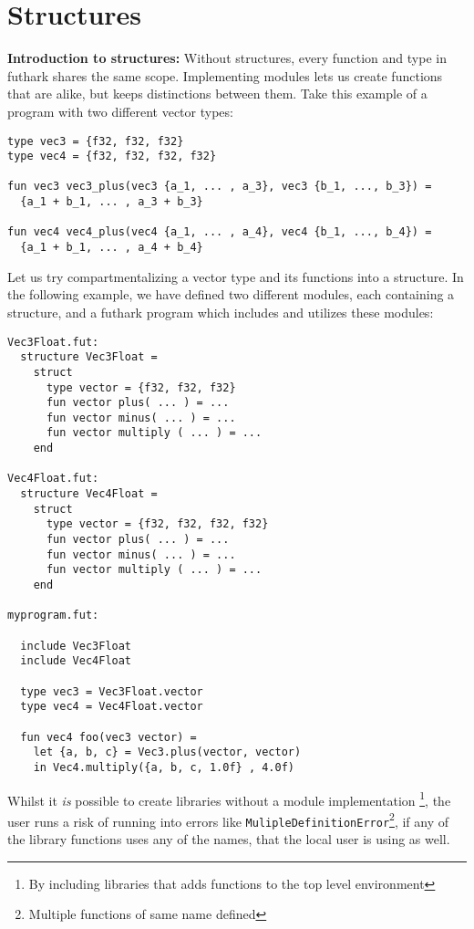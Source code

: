 \section{Structures}
\label{sec:structures}
\textbf{Introduction to structures:}
\label{subsec:structuresaregood}
Without structures, every function and type in futhark shares the same scope.
Implementing modules lets us create functions that are alike, but keeps
distinctions between them.
Take this example of a program with two different vector types:

\begin{verbatim}
type vec3 = {f32, f32, f32}
type vec4 = {f32, f32, f32, f32}

fun vec3 vec3_plus(vec3 {a_1, ... , a_3}, vec3 {b_1, ..., b_3}) =
  {a_1 + b_1, ... , a_3 + b_3}

fun vec4 vec4_plus(vec4 {a_1, ... , a_4}, vec4 {b_1, ..., b_4}) =
  {a_1 + b_1, ... , a_4 + b_4}
\end{verbatim}

Let us try compartmentalizing a vector type and its functions into a structure.
In the following example, we have defined two different modules, each
containing a structure,
and a futhark program which includes and utilizes these modules:
\begin{verbatim}
Vec3Float.fut:
  structure Vec3Float = 
    struct
      type vector = {f32, f32, f32}
      fun vector plus( ... ) = ...
      fun vector minus( ... ) = ...
      fun vector multiply ( ... ) = ...
    end

Vec4Float.fut:
  structure Vec4Float = 
    struct
      type vector = {f32, f32, f32, f32}
      fun vector plus( ... ) = ...
      fun vector minus( ... ) = ...
      fun vector multiply ( ... ) = ...
    end
  
myprogram.fut:

  include Vec3Float
  include Vec4Float

  type vec3 = Vec3Float.vector
  type vec4 = Vec4Float.vector
  
  fun vec4 foo(vec3 vector) = 
    let {a, b, c} = Vec3.plus(vector, vector)
    in Vec4.multiply({a, b, c, 1.0f} , 4.0f)
\end{verbatim}

Whilst it \textit{is} possible to create libraries without a module
implementation \footnote{By including libraries that adds functions to the top
  level environment}, the user runs a risk of running into errors like
\texttt{MulipleDefinitionError}\footnote{Multiple functions of same name
  defined}, if any of the library functions uses any of the names, that the
local user is using as well.

